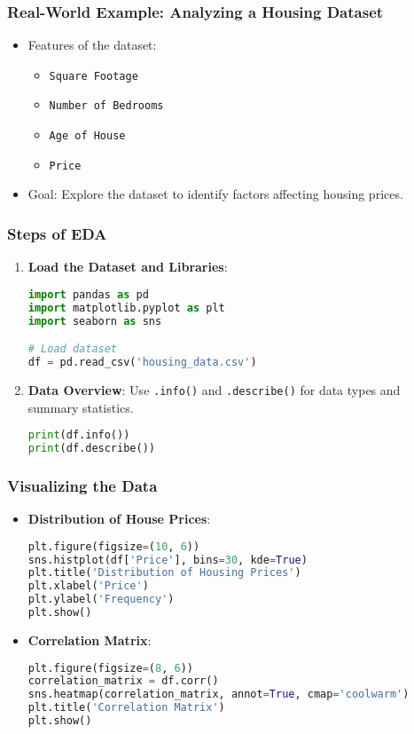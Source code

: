 \documentclass{beamer}
\begin{document}
\begin{frame}[fragile]
    \frametitle{Real-World Example: Analyzing a Housing Dataset}
    \begin{itemize}
        \item Features of the dataset:
        \begin{itemize}
            \item \texttt{Square Footage}
            \item \texttt{Number of Bedrooms}
            \item \texttt{Age of House}
            \item \texttt{Price}
        \end{itemize}
        \item Goal: Explore the dataset to identify factors affecting housing prices.
    \end{itemize}
\end{frame}

\begin{frame}[fragile]
    \frametitle{Steps of EDA}
    \begin{enumerate}
        \item \textbf{Load the Dataset and Libraries}:
        \begin{lstlisting}[language=Python]
import pandas as pd
import matplotlib.pyplot as plt
import seaborn as sns

# Load dataset
df = pd.read_csv('housing_data.csv')
        \end{lstlisting}

        \item \textbf{Data Overview}:
        Use \texttt{.info()} and \texttt{.describe()} for data types and summary statistics.
        \begin{lstlisting}[language=Python]
print(df.info())
print(df.describe())
        \end{lstlisting}
    \end{enumerate}
\end{frame}

\begin{frame}[fragile]
    \frametitle{Visualizing the Data}
    \begin{itemize}
        \item \textbf{Distribution of House Prices}:
        \begin{lstlisting}[language=Python]
plt.figure(figsize=(10, 6))
sns.histplot(df['Price'], bins=30, kde=True)
plt.title('Distribution of Housing Prices')
plt.xlabel('Price')
plt.ylabel('Frequency')
plt.show()
        \end{lstlisting}
        \item \textbf{Correlation Matrix}:
        \begin{lstlisting}[language=Python]
plt.figure(figsize=(8, 6))
correlation_matrix = df.corr()
sns.heatmap(correlation_matrix, annot=True, cmap='coolwarm')
plt.title('Correlation Matrix')
plt.show()
        \end{lstlisting}
    \end{itemize}
\end{frame}
\end{document}
